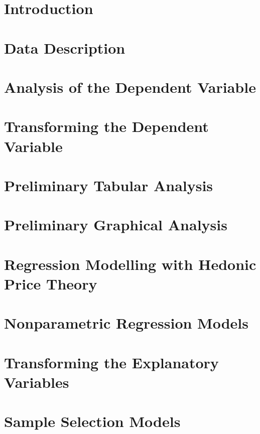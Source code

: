 \documentclass[11pt]{book}
\begin{document}



\pagebreak
\chapter{Introduction}


\pagebreak
\chapter{Data Description}


\pagebreak
\chapter{Analysis of the Dependent Variable}


\pagebreak
\chapter{Transforming the Dependent Variable}


\pagebreak
\chapter{Preliminary Tabular Analysis}


\pagebreak
\chapter{Preliminary Graphical Analysis}


\pagebreak
\chapter{Regression Modelling with Hedonic Price Theory}


\pagebreak
\chapter{Nonparametric Regression Models}


\pagebreak
\chapter{Transforming the Explanatory Variables}


\pagebreak
\chapter{Sample Selection Models}


% 


\end{document}
